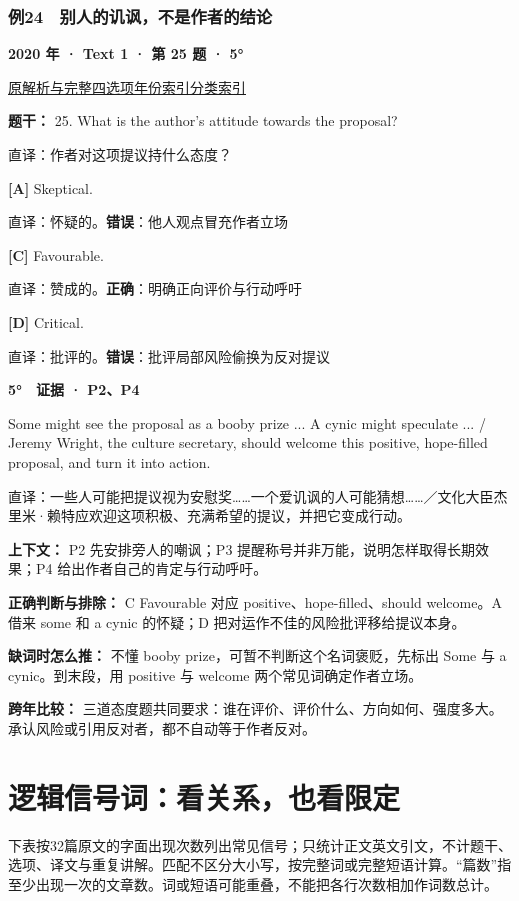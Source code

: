 \documentclass[11pt,a4paper]{article}
\begin{document}
\subsubsection{例24　别人的讥讽，不是作者的结论}\label{case-2020-T1-Q25}
\noindent\textbf{2020 年 · Text 1 · 第 25 题 · 5°}\par\noindent \href{https://zj139.github.io/math-notes/english/7f03a0ee86b303996bed3f18/\#q25}{原解析与完整四选项}\quad \hyperref[idx-2020-T1-Q25]{年份索引}\quad \hyperref[class-R10]{分类索引}\par\smallskip
\noindent\textbf{题干：} 25. What is the author’s attitude towards the proposal?\par\smallskip
直译：作者对这项提议持什么态度？

\noindent\textbf{[A]} Skeptical.\par\nopagebreak
\noindent 直译：怀疑的。\quad\textbf{错误}：他人观点冒充作者立场\par\smallskip
{}\noindent\textbf{[C]} Favourable.\par\nopagebreak
\noindent 直译：赞成的。\quad\textbf{正确}：明确正向评价与行动呼吁\par\smallskip
{}\noindent\textbf{[D]} Critical.\par\nopagebreak
\noindent 直译：批评的。\quad\textbf{错误}：批评局部风险偷换为反对提议\par\smallskip
\begin{evidence}\textbf{5°　证据 · P2、P4}\par Some might see the proposal as a booby prize ... A cynic might speculate ... / Jeremy Wright, the culture secretary, should welcome this positive, hope-filled proposal, and turn it into action.\par 直译：一些人可能把提议视为安慰奖……一个爱讥讽的人可能猜想……／文化大臣杰里米·赖特应欢迎这项积极、充满希望的提议，并把它变成行动。\end{evidence}
\noindent\textbf{上下文：} P2 先安排旁人的嘲讽；P3 提醒称号并非万能，说明怎样取得长期效果；P4 给出作者自己的肯定与行动呼吁。\par\smallskip
\noindent\textbf{正确判断与排除：} C Favourable 对应 positive、hope-filled、should welcome。A 借来 some 和 a cynic 的怀疑；D 把对运作不佳的风险批评移给提议本身。\par\smallskip
\noindent\textbf{缺词时怎么推：} 不懂 booby prize，可暂不判断这个名词褒贬，先标出 Some 与 a cynic。到末段，用 positive 与 welcome 两个常见词确定作者立场。\par\smallskip
\noindent\textbf{跨年比较：} 三道态度题共同要求：谁在评价、评价什么、方向如何、强度多大。承认风险或引用反对者，都不自动等于作者反对。\par\smallskip
\clearpage\section{逻辑信号词：看关系，也看限定}\label{signals}
下表按32篇原文的字面出现次数列出常见信号；只统计正文英文引文，不计题干、选项、译文与重复讲解。匹配不区分大小写，按完整词或完整短语计算。“篇数”指至少出现一次的文章数。词或短语可能重叠，不能把各行次数相加作词数总计。
\end{document}
